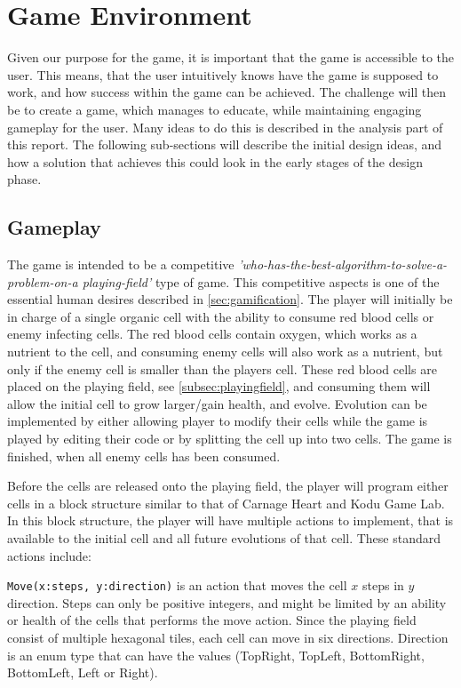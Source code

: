 \section{Game Environment}
\label{sec:game_environment}

Given our purpose for the game, it is important that the game is accessible to the user.
This means, that the user intuitively knows have the game is supposed to work, and how success within the game can be achieved.
The challenge will then be to create a game, which manages to educate, while maintaining engaging gameplay for the user.
Many ideas to do this is described in the analysis part of this report.
The following sub-sections will describe the initial design ideas, and how a solution that achieves this could look in the early stages of the design phase.

\subsection{Gameplay}

The game is intended to be a competitive \textit{'who-has-the-best-algorithm-to-solve-a-problem-on-a playing-field'} type of game.
This competitive aspects is one of the essential human desires described in \autoref{sec:gamification}.
The player will initially be in charge of a single organic cell with the ability to consume red blood cells or enemy infecting cells.
The red blood cells contain oxygen, which works as a nutrient to the cell, and consuming enemy cells will also work as a nutrient, but only if the enemy cell is smaller than the players cell.
These red blood cells are placed on the playing field, see \autoref{subsec:playingfield}, and consuming them will allow the initial cell to grow larger/gain health, and evolve.
Evolution can be implemented by either allowing player to modify their cells while the game is played by editing their code or by splitting the cell up into two cells.
The game is finished, when all enemy cells has been consumed.\newline

Before the cells are released onto the playing field, the player will program either cells in a block structure similar to that of Carnage Heart and Kodu Game Lab. In this block structure, the player will have multiple actions to implement, that is available to the initial cell and all future evolutions of that cell. These standard actions include:\newline


\verb|Move(x:steps, y:direction)| is an action that moves the cell $x$ steps in $y$ direction.
Steps can only be positive integers, and might be limited by an ability or health of the cells that performs the move action.
Since the playing field consist of multiple hexagonal tiles, each cell can move in six directions.
Direction is an enum type that can have the values (TopRight, TopLeft, BottomRight, BottomLeft, Left or Right).\newline

